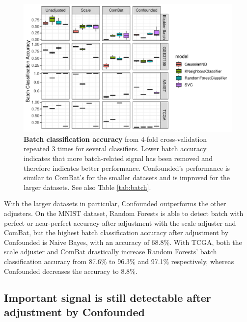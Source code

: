 \documentclass[notitlepage]{article}
\begin{document}
\begin{figure}
	\centering
	\includegraphics[width=\columnwidth]{figures/final/batch_accuracy}
	\caption{\textbf{Batch classification accuracy} from 4-fold cross-validation repeated 3 times for several classifiers.
	Lower batch accuracy indicates that more batch-related signal has been removed and therefore indicates better performance.
	Confounded's performance is similar to ComBat's for the smaller datasets and is improved for the larger datasets.
	See also Table \ref{tab:batch}.}
	\label{fig:batch}
\end{figure}
\begin{table}
	\centering
	
	\caption{\textbf{Batch classification accuracy} for several datasets and adjusters.
	The ideal batch adjuster would completely remove all signal due to batch and would therefore \textit{decrease} batch classification accuracy to around the baseline for all classifiers.
	See also Figure \ref{fig:batch}.}
	\label{tab:batch}
\end{table}

With the larger datasets in particular, Confounded outperforms the other adjusters.
On the MNIST dataset, Random Forests is able to detect batch with perfect or near-perfect accuracy after adjustment with the scale adjuster and ComBat, but the highest batch classification accuracy after adjustment by Confounded is Naive Bayes, with an accuracy of 68.8\%.
With TCGA, both the scale adjuster and ComBat drastically increase Random Forests' batch classification accuracy from 87.6\% to 96.3\% and 97.1\% respectively, whereas Confounded decreases the accuracy to 8.8\%.

\subsection{Important signal is still detectable after adjustment by Confounded}
\end{document}
